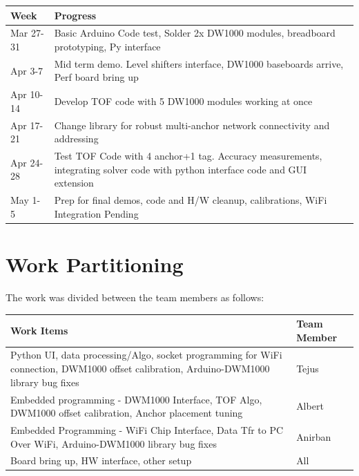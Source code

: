 \documentclass[journal,transmag]{IEEEtran}
\begin{document}
\begin{center}
\begin{tabular}{ |m{1.5cm}|m{7cm}|}
\hline
\textbf{Week} & \textbf{Progress} \\ 
\hline
Mar 27-31 & Basic Arduino Code test, Solder 2x DW1000
modules, breadboard prototyping, Py interface\\
\hline
Apr 3-7 &Mid term demo. Level shifters interface, DW1000
baseboards arrive, Perf board bring up\\
\hline
Apr 10-14 & Develop TOF code with 5 DW1000 modules
working at once\\
\hline
Apr 17-21 & Change library for robust multi-anchor network
connectivity and addressing\\
\hline
Apr 24-28 & Test TOF Code with 4 anchor+1 tag. Accuracy
measurements,
integrating solver code with python interface code
and GUI extension\\
\hline
May 1-5 & Prep for final demos, code and H/W cleanup,
calibrations, WiFi Integration Pending\\
\hline
\end{tabular}
\end{center}



\section{Work Partitioning}
The work was divided between the team members as follows:

\begin{center}
\begin{tabular}{ |m{6cm}|m{1cm}|}
\hline
Work Items &	Team Member\\
\hline
Python UI, data processing/Algo, socket programming for WiFi connection, DWM1000 offset calibration, Arduino-DWM1000 library bug fixes&	Tejus\\
\hline
Embedded programming - DWM1000 Interface, TOF Algo, DWM1000 offset calibration, Anchor placement tuning &	Albert\\
\hline
Embedded Programming - WiFi Chip Interface, Data Tfr to PC Over WiFi, Arduino-DWM1000 library bug fixes & Anirban\\
\hline
Board bring up, HW interface, other setup & All\\
\hline
\end{tabular}
\end{center}
\end{document}
